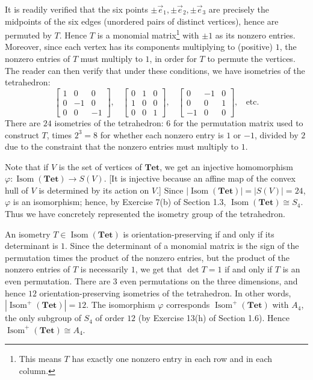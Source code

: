 \documentclass[leqno]{book}
\begin{document}
It is readily verified that the six points $\pm\vec e_1,\pm\vec e_2,\pm\vec e_3$ are precisely the midpoints of the six edges (unordered pairs of distinct vertices), hence are permuted by $T$.  Hence $T$ is a monomial matrix\footnote{This means $T$ has exactly one nonzero entry in each row and in each column.} with $\pm 1$ as its nonzero entries.  Moreover, since each vertex has its components multiplying to (positive) $1$, the nonzero entries of $T$ must multiply to $1$, in order for $T$ to permute the vertices.  The reader can then verify that under these conditions, we have isometries of the tetrahedron:
$$\begin{bmatrix}1&0&0\\0&-1&0\\0&0&-1\end{bmatrix},~~~~\begin{bmatrix}0&1&0\\1&0&0\\0&0&1\end{bmatrix},~~~~\begin{bmatrix}0&-1&0\\0&0&1\\-1&0&0\end{bmatrix},~~~~\text{etc.}$$
There are $24$ isometries of the tetrahedron: $6$ for the permutation matrix used to construct $T$, times $2^3=8$ for whether each nonzero entry is $1$ or $-1$, divided by $2$ due to the constraint that the nonzero entries must multiply to $1$.

Note that if $V$ is the set of vertices of $\textbf{Tet}$, we get an injective homomorphism $\varphi:\operatorname{Isom}(\textbf{Tet})\to S(V)$.  [It is injective because an affine map of the convex hull of $V$ is determined by its action on $V$.]  Since $|\operatorname{Isom}(\textbf{Tet})|=|S(V)|=24$, $\varphi$ is an isomorphism; hence, by Exercise 7(b) of Section 1.3, $\operatorname{Isom}(\textbf{Tet})\cong S_4$.  Thus we have concretely represented the isometry group of the tetrahedron.

An isometry $T\in\operatorname{Isom}(\textbf{Tet})$ is orientation-preserving if and only if its determinant is $1$.  Since the determinant of a monomial matrix is the sign of the permutation times the product of the nonzero entries, but the product of the nonzero entries of $T$ is necessarily $1$, we get that $\det T=1$ if and only if $T$ is an even permutation.  There are $3$ even permutations on the three dimensions, and hence $12$ orientation-preserving isometries of the tetrahedron.  In other words, $|\operatorname{Isom}^+(\mathbf{Tet})|=12$.  The isomorphism $\varphi$ corresponds $\operatorname{Isom}^+(\mathbf{Tet})$ with $A_4$, the only subgroup of $S_4$ of order $12$ (by Exercise 13(h) of Section 1.6).  Hence $\operatorname{Isom}^+(\mathbf{Tet})\cong A_4$.\\
\end{document}

